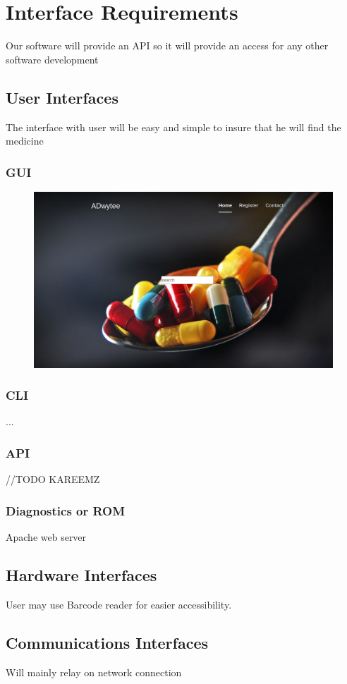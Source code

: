 \documentclass[]{article}
\begin{document}
\section{Interface Requirements}
Our software will provide an API so it will provide an access for any other software development
\subsection{User Interfaces}
The interface with user will be easy and simple to insure  that he will find the medicine
\subsubsection {GUI}
\begin{figure}[H]
\centering
\includegraphics[scale=0.2]{./Home}
\end{figure}

\subsubsection {CLI}
...
\subsubsection {API}
//TODO KAREEMZ
\subsubsection {Diagnostics or ROM}
Apache web server

\subsection{Hardware Interfaces}
User may use Barcode reader for easier accessibility.
\subsection{Communications Interfaces}
Will mainly relay on network connection
\end{document}
